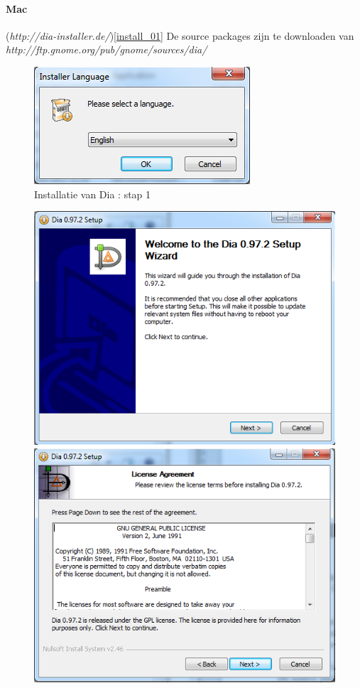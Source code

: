 \documentclass[12pt,a4paper]{report}
\begin{document}
\begin{flushleft}
\paragraph*{Mac}
(\textit{http://dia-installer.de/})\ref{install_01}\linebreak
De source packages zijn te downloaden van \textit{http://ftp.gnome.org/pub/gnome/sources/dia/}
\begin{figure}[H]
\includegraphics[scale=0.75]{images/install_02.png}
\centering
\vspace{-10pt}
\caption{Installatie van Dia : stap 1}
\end{figure}
\begin{figure}[H]
\includegraphics[scale=0.5]{images/install_03.png}
\includegraphics[scale=0.5]{images/install_04.png}

\end{figure}
\end{flushleft}
\end{document}
